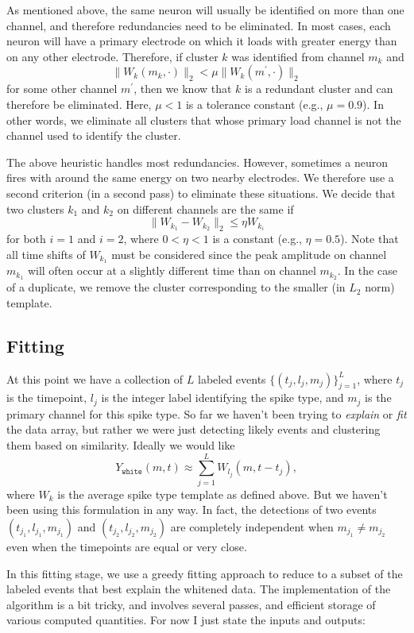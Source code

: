 \documentclass[hidelinks,10pt]{article}
\begin{document}
As mentioned above, the same neuron will usually be identified on more than one channel, and therefore redundancies need to be eliminated. In most cases, each neuron will have a primary electrode on which it loads with greater energy than on any other electrode. Therefore, if cluster $k$ was identified from channel $m_k$ and 
$$\|W_k(m_k,\cdot)\|_2<\mu \|W_k(m^\prime,\cdot)\|_2$$
for some other channel $m^\prime$, then we know that $k$ is a redundant cluster and can therefore be eliminated. Here, $\mu<1$ is a tolerance constant (e.g., $\mu=0.9$). In other words, we eliminate all clusters that whose primary load channel is not the channel used to identify the cluster.

The above heuristic handles most redundancies. However, sometimes a neuron fires with around the same energy on two nearby electrodes. We therefore use a second criterion (in a second pass) to eliminate these situations. We decide that two clusters $k_1$ and $k_2$ on different channels are the same if 
$$\|W_{k_1}-W_{k_2}\|_2\leq \eta W_{k_i}$$
for both $i=1$ and $i=2$, where $0<\eta<1$ is a constant (e.g., $\eta=0.5$). Note that all time shifts of $W_{k_1}$ must be considered since the peak amplitude on channel $m_{k_1}$ will often occur at a slightly different time than on channel $m_{k_2}$. In the case of a duplicate, we remove the cluster corresponding to the smaller (in $L_2$ norm) template.

\subsection {Fitting}

At this point we have a collection of $L$ labeled events $\{(t_j,l_j,m_j)\}_{j=1}^L$, where $t_j$ is the timepoint, $l_j$ is the integer label identifying the spike type, and $m_j$ is the primary channel for this spike type. So far we haven't been trying to \emph{explain} or \emph{fit} the data array, but rather we were just detecting likely events and clustering them based on similarity. Ideally we would like
$$Y_\texttt{white}(m,t)\approx\sum_{j=1}^L W_{l_j}(m,t-t_j),$$
where $W_k$ is the average spike type template as defined above.
But we haven't been using this formulation in any way. In fact, the detections of two events $(t_{j_1},l_{j_1},m_{j_1})$ and $(t_{j_2},l_{j_2},m_{j_2})$ are completely independent when $m_{j_1}\neq m_{j_2}$ even when the timepoints are equal or very close.

In this fitting stage, we use a greedy fitting approach to reduce to a subset of the labeled events that best explain the whitened data. The implementation of the algorithm is a bit tricky, and involves several passes, and efficient storage of various computed quantities. For now I just state the inputs and outputs:
\end{document}

